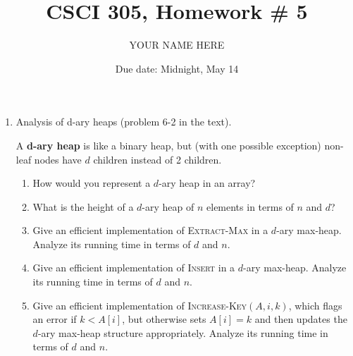 \documentclass{article}
\title{CSCI 305, Homework \# 5}
\author{YOUR NAME HERE}
\date{Due date:  Midnight, May 14}
\begin{document}
\maketitle

\begin{enumerate}
\item Analysis of d-ary heaps (problem 6-2 in the text).

 A \textbf{d-ary heap} is like a binary heap, but (with one possible
 exception) non-leaf nodes have $d$ children instead of 2 children.
 \begin{enumerate}
 \item How would you represent a $d$-ary heap in an array?
   \item What is the height of a $d$-ary heap of $n$ elements in terms
     of $n$ and $d$?
   \item Give an efficient implementation of \textsc{Extract-Max} in
       a $d$-ary max-heap.  Analyze its running time in terms of $d$
       and $n$.
     \item Give an efficient implementation of \textsc{Insert} in
       a $d$-ary max-heap.  Analyze its running time in terms of $d$
       and $n$.
     \item Give an efficient implementation of
       \textsc{Increase-Key}$(A,i,k)$,
       which flags an error if $k < A[i]$, but otherwise sets $A[i] =
       k$ and then updates the $d$-ary max-heap structure
       appropriately.    Analyze its running time in terms of $d$
       and $n$.
 \end{enumerate}
\end{enumerate}
\end{document}
